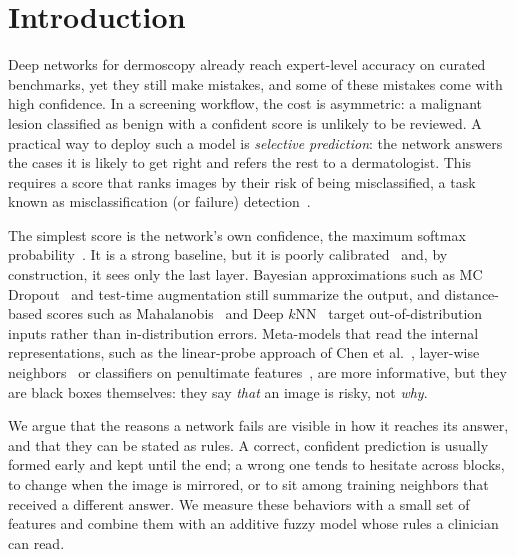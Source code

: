 \section{Introduction}

Deep networks for dermoscopy already reach expert-level accuracy on curated benchmarks, yet they still make mistakes, and some of these
mistakes come with high confidence. In a screening workflow, the cost is asymmetric: a malignant lesion classified as benign with a
confident score is unlikely to be reviewed. A practical way to deploy such a model is \emph{selective prediction}: the network answers
the cases it is likely to get right and refers the rest to a dermatologist. This requires a score that ranks images by their risk of
being misclassified, a task known as misclassification (or failure) detection~\cite{hendrycks2017,jaeger2023}.

The simplest score is the network's own confidence, the maximum softmax probability~\cite{hendrycks2017}. It is a strong baseline,
but it is poorly calibrated~\cite{guo2017} and, by construction, it sees only the last layer. Bayesian approximations such as
MC Dropout~\cite{gal2016} and test-time augmentation still summarize the output, and distance-based scores such as
Mahalanobis~\cite{lee2018} and Deep $k$NN~\cite{papernot2018} target out-of-distribution inputs rather than in-distribution errors.
Meta-models that read the internal representations, such as the linear-probe approach of Chen et al.~\cite{chen2019},
layer-wise neighbors~\cite{font2025} or classifiers on penultimate features~\cite{gorbett2022}, are more informative,
but they are black boxes themselves: they say \emph{that} an image is risky, not \emph{why}.

We argue that the reasons a network fails are visible in how it reaches its answer, and that they can be stated as rules.
A correct, confident prediction is usually formed early and kept until the end; a wrong one tends to hesitate across blocks,
to change when the image is mirrored, or to sit among training neighbors that received a different answer.
We measure these behaviors with a small set of features and combine them with an additive fuzzy model whose rules a clinician can read.

